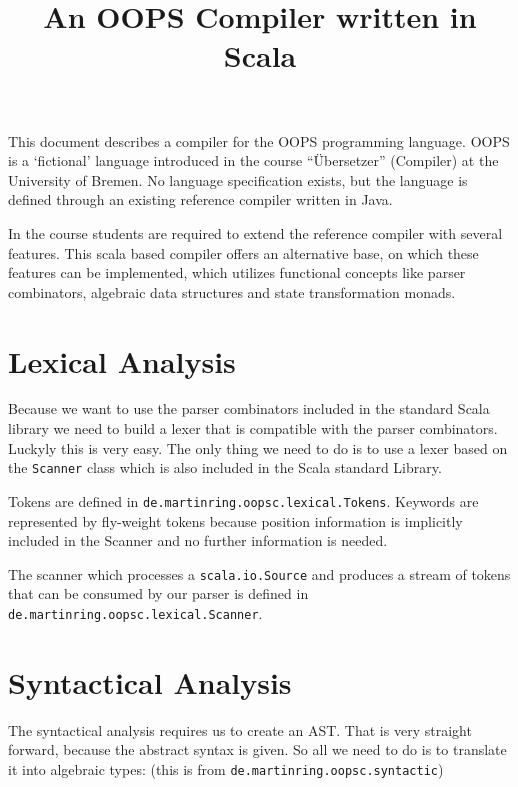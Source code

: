 \documentclass{style}
\title{An OOPS Compiler written in Scala}
\begin{document}
\maketitle


This document describes a compiler for the OOPS programming language. OOPS is a `fictional' language introduced in the course ``Übersetzer'' (Compiler) at the University of Bremen. No language specification exists, but the language is defined through an existing reference compiler written in Java.

In the course students are required to extend the reference compiler with several features. This scala based compiler offers an alternative base, on which these features can be implemented, which utilizes functional concepts like parser combinators, algebraic data structures and state transformation monads.
 
\section{Lexical Analysis}

Because we want to use the parser combinators included in the standard Scala library we need to build a lexer that is compatible with the parser combinators. Luckyly this is very easy. The only thing we need to do is to use a lexer based on the \texttt{Scanner} class which is also included in the Scala standard Library. 

Tokens are defined in \texttt{de.martinring.oopsc.lexical.Tokens}. Keywords are represented by fly-weight tokens because position information is implicitly included in the Scanner and no further information is needed.

The scanner which processes a \texttt{scala.io.Source} and produces a stream of tokens that can be consumed by our parser is defined in \texttt{de.martinring.oopsc.lexical.Scanner}.

\section{Syntactical Analysis}

The syntactical analysis requires us to create an AST. That is very straight forward, because the abstract syntax is given. So all we need to do is to translate it into algebraic types: (this is from \texttt{de.martinring.oopsc.syntactic})
\end{document}
